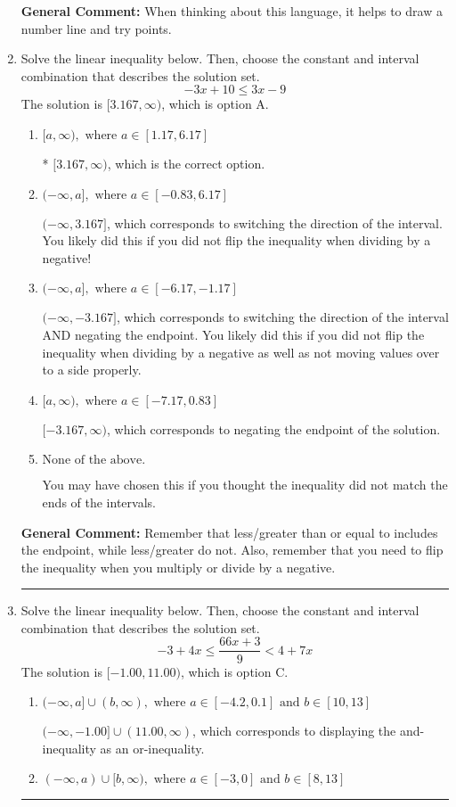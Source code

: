 \documentclass{extbook}[14pt]
\newcommand{\litem}[1]{\item #1

\rule{\textwidth}{0.4pt}}
\begin{document}
\begin{enumerate}
{\textbf{General Comment:} When thinking about this language, it helps to draw a number line and try points.
}
\litem{
Solve the linear inequality below. Then, choose the constant and interval combination that describes the solution set.
\[ -3x + 10 \leq 3x -9 \]The solution is \( [3.167, \infty) \), which is option A.\begin{enumerate}[label=\Alph*.]
\item \( [a, \infty), \text{ where } a \in [1.17, 6.17] \)

* $[3.167, \infty)$, which is the correct option.
\item \( (-\infty, a], \text{ where } a \in [-0.83, 6.17] \)

 $(-\infty, 3.167]$, which corresponds to switching the direction of the interval. You likely did this if you did not flip the inequality when dividing by a negative!
\item \( (-\infty, a], \text{ where } a \in [-6.17, -1.17] \)

 $(-\infty, -3.167]$, which corresponds to switching the direction of the interval AND negating the endpoint. You likely did this if you did not flip the inequality when dividing by a negative as well as not moving values over to a side properly.
\item \( [a, \infty), \text{ where } a \in [-7.17, 0.83] \)

 $[-3.167, \infty)$, which corresponds to negating the endpoint of the solution.
\item \( \text{None of the above}. \)

You may have chosen this if you thought the inequality did not match the ends of the intervals.
\end{enumerate}

\textbf{General Comment:} Remember that less/greater than or equal to includes the endpoint, while less/greater do not. Also, remember that you need to flip the inequality when you multiply or divide by a negative.
}
\litem{
Solve the linear inequality below. Then, choose the constant and interval combination that describes the solution set.
\[ -3 + 4 x \leq \frac{66 x + 3}{9} < 4 + 7 x \]The solution is \( [-1.00, 11.00) \), which is option C.\begin{enumerate}[label=\Alph*.]
\item \( (-\infty, a] \cup (b, \infty), \text{ where } a \in [-4.2, 0.1] \text{ and } b \in [10, 13] \)

$(-\infty, -1.00] \cup (11.00, \infty)$, which corresponds to displaying the and-inequality as an or-inequality.
\item \( (-\infty, a) \cup [b, \infty), \text{ where } a \in [-3, 0] \text{ and } b \in [8, 13] \)


\end{enumerate}}
\end{enumerate}
\end{document}

